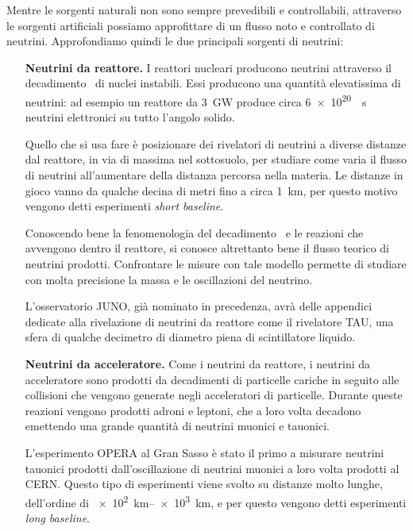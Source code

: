         Mentre le sorgenti naturali non sono sempre prevedibili e controllabili, attraverso le sorgenti artificiali possiamo approfittare di un flusso noto e controllato di neutrini. Approfondiamo quindi le due principali sorgenti di neutrini:
        \begin{enumerate}[wide = 0pt, leftmargin = 1.5\parindent]
            \item[\textbf{Neutrini da reattore.}] I reattori nucleari producono neutrini attraverso il decadimento \betap\ di nuclei instabili. Essi producono una quantità elevatissima di neutrini: ad esempio un reattore da \SI{3}{\giga\watt} produce circa \SI{6e+20}{\per\second} neutrini elettronici su tutto l'angolo solido.
            
            Quello che si usa fare è posizionare dei rivelatori di neutrini a diverse distanze dal reattore, in via di massima nel sottosuolo, per studiare come varia il flusso di neutrini all'aumentare della distanza percorsa nella materia. Le distanze in gioco vanno da qualche decina di metri fino a circa \SI{1}{\kilo\meter}, per questo motivo vengono detti esperimenti \emph{short baseline}.

            Conoscendo bene la fenomenologia del decadimento \betap\ e le reazioni che avvengono dentro il reattore, si conosce altrettanto bene il flusso teorico di neutrini prodotti. Confrontare le misure con tale modello permette di studiare con molta precisione la massa e le oscillazioni del neutrino.

            L'osservatorio JUNO, già nominato in precedenza, avrà delle appendici dedicate alla rivelazione di neutrini da reattore come il rivelatore TAU, una sfera di qualche decimetro di diametro piena di scintillatore liquido.

            \item[\textbf{Neutrini da acceleratore.}] Come i neutrini da reattore, i neutrini da acceleratore sono prodotti da decadimenti di particelle cariche in seguito alle collisioni che vengono generate negli acceleratori di particelle. Durante queste reazioni vengono prodotti adroni e leptoni, che a loro volta decadono emettendo una grande quantità di neutrini muonici e tauonici.
            
            L'esperimento OPERA al Gran Sasso è stato il primo a misurare neutrini tauonici prodotti dall'oscillazione di neutrini muonici a loro volta prodotti al CERN. Questo tipo di esperimenti viene svolto su distanze molto lunghe, dell'ordine di \SI{e+2}{\kilo\meter}--\SI{e+3}{\kilo\meter}, e per questo vengono detti esperimenti \emph{long baseline}. 
        \end{enumerate}

